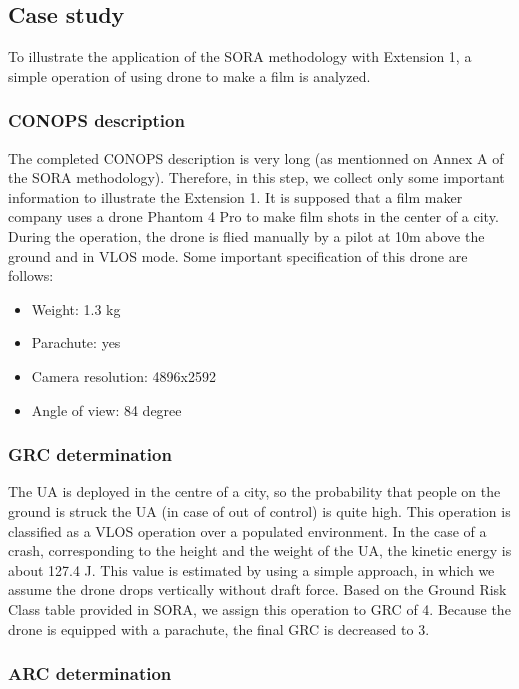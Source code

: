 \documentclass[a4paper, 10, conference]{ieeeconf}  %
\begin{document}
\subsection{Case study} \label{sec:cas}

To illustrate the application of the SORA methodology with Extension 1, a simple operation of using drone to make a film is analyzed. 

\subsubsection{CONOPS description}
The completed CONOPS description is very long (as mentionned on Annex A of the SORA methodology). Therefore, in this step, we collect only some important information to illustrate the Extension 1. It is supposed that a film maker company uses a drone Phantom 4 Pro to make film shots in the center of a city. During the operation, the drone is flied manually by a pilot at 10m above the ground and in VLOS mode. Some important specification of this drone are follows:
\begin{itemize}
    \item Weight: 1.3 kg
    \item Parachute: yes
    \item Camera resolution: 4896x2592
    \item Angle of view: 84 degree
\end{itemize}

\subsubsection{GRC determination}

The UA is deployed in the centre of a city, so the probability that people on the ground is struck the UA (in case of out of control) is quite high. This operation is classified as a VLOS operation over a populated environment. In the case of a crash, corresponding to the height and the weight of the UA, the kinetic energy is about 127.4 J. This value is estimated by using a simple approach, in which we assume the drone drops vertically without draft force. Based on the Ground Risk Class table provided in SORA, we assign this operation to GRC of 4. Because the drone is equipped with a parachute, the final GRC is decreased to 3.

\subsubsection{ARC determination}
\end{document}
